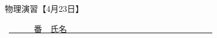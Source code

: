 \documentclass[a4paper,9pt]{jsarticle}
\begin{document}
\hakosyokika
\begin{center}
{\Large 物理演習【4月23日】}
\end{center}
\hfill ~\underline{~~~~~~番　氏名~~~~~~~~~~~~~~~~~~~~~~~~~~~~~~~~~~~}
\hakosyokika

\begin{enumerate}
    
\newpage
    
\newpage
    
\newpage
    
%     
%     
%     
%     
%     
\vfill
\end{enumerate}
\end{document}
